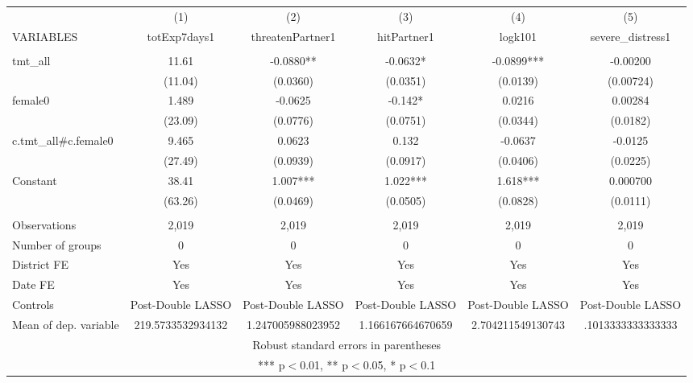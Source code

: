 \documentclass[]{article}
\begin{document}
\begin{tabular}{lccccc} \hline
 & (1) & (2) & (3) & (4) & (5) \\
VARIABLES & totExp7days1 & threatenPartner1 & hitPartner1 & logk101 & severe\_distress1 \\ \hline
 &  &  &  &  &  \\
tmt\_all & 11.61 & -0.0880** & -0.0632* & -0.0899*** & -0.00200 \\
 & (11.04) & (0.0360) & (0.0351) & (0.0139) & (0.00724) \\
female0 & 1.489 & -0.0625 & -0.142* & 0.0216 & 0.00284 \\
 & (23.09) & (0.0776) & (0.0751) & (0.0344) & (0.0182) \\
c.tmt\_all\#c.female0 & 9.465 & 0.0623 & 0.132 & -0.0637 & -0.0125 \\
 & (27.49) & (0.0939) & (0.0917) & (0.0406) & (0.0225) \\
Constant & 38.41 & 1.007*** & 1.022*** & 1.618*** & 0.000700 \\
 & (63.26) & (0.0469) & (0.0505) & (0.0828) & (0.0111) \\
 &  &  &  &  &  \\
Observations & 2,019 & 2,019 & 2,019 & 2,019 & 2,019 \\
Number of groups & 0 & 0 & 0 & 0 & 0 \\
District FE & Yes & Yes & Yes & Yes & Yes \\
Date FE & Yes & Yes & Yes & Yes & Yes \\
Controls & Post-Double LASSO & Post-Double LASSO & Post-Double LASSO & Post-Double LASSO & Post-Double LASSO \\
 Mean of dep. variable & 219.5733532934132 & 1.247005988023952 & 1.166167664670659 & 2.704211549130743 & .1013333333333333 \\ \hline
\multicolumn{6}{c}{ Robust standard errors in parentheses} \\
\multicolumn{6}{c}{ *** p$<$0.01, ** p$<$0.05, * p$<$0.1} \\
\end{tabular}
\end{document}
